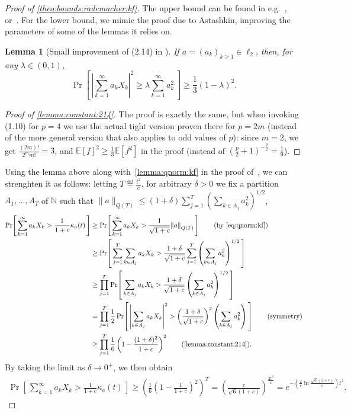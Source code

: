 \documentclass[11pt]{article}
\newtheorem{lemma}[lem]{Lemma}
\theoremstyle{remark}   	\newtheorem{remark}[theorem]{Remark}
\theoremstyle{definition}   	\newaliascnt{defn}{theorem}
\newenvironment{proofof}[1]{\begin{proof}[Proof of {#1}]}{\end{proof}}
\newcommand{\proba}{\Pr}
\newcommand{\probaOf}[1]{\proba\!\left[\, #1\, \right]}
\newcommand{\expect}[1]{\mathbb{E}\!\left[#1\right]}
\newcommand{\norm}[1]{\lVert#1{\rVert}}
\newcommand{\abs}[1]{\left\lvert #1 \right\rvert}
\newcommand{\N}{\ensuremath{\mathbb{N}}\xspace}
\newcommand{\lp}[1][1]{\ell_{#1}}
\newcommand{\kf}[1]{\kappa_{#1}}
\begin{document}
\begin{proofof}{\autoref{theo:bounds:rademacher:kf}}
The upper bound can be found in e.g.~\cite{MS:90}, or~\cite[Theorem 2.2]{Astashkin:2010}. For the lower bound, we mimic the proof due to Astashkin, improving the parameters of some of the lemmas it relies on.

\begin{lemma}[{Small improvement of (2.14) in \cite[Lemma 2.3]{Astashkin:2010}}]\label{lemma:constant:214}
  If $a=(a_k)_{k\geq 1}\in\lp[2]$, then, for any $\lambda\in(0,1)$,
  \begin{equation}
    \probaOf{ \abs{ \sum_{k=1}^\infty a_k X_k }^2 \geq \lambda \sum_{k=1}^\infty a_k^2 } \geq \frac{1}{3}(1-\lambda)^2.
  \end{equation}
\end{lemma}
\begin{proofof}{\autoref{lemma:constant:214}}
The proof is exactly the same, but when invoking (1.10) for $p=4$ we use the actual tight version proven there for $p=2m$ (instead of the more general version that also applies to odd values of $p$): since $m=2$, we get $\frac{(2m)!}{2^m m!} = 3$, and $\expect{f}^2 \geq \frac{1}{3} \expect{f^2}$ in the proof (instead of $(\frac{p}{2}+1)^{-\frac{p}{2}}=\frac{1}{9}$).
\end{proofof}

Using the lemma above along with~\autoref{lemma:qnorm:kf} in the proof of~\cite[Theorem 2.2]{Astashkin:2010}, we can strenghten it as follows: letting $T\eqdef \frac{t^2}{c}$, for arbitrary $\delta>0$ we fix a partition $A_1,\dots,A_{T}$ of $\N$ such that $\norm{a}_{Q(T)} \leq (1+\delta) \sum_{j=1}^{T} \left( \sum_{k\in A_j} a_k^2\right)^{1/2}$,
\begin{align*}
  \probaOf{ \sum_{k=1}^\infty a_k X_k > \frac{1}{1+c} \kf{a}(t) } 
  &\geq \probaOf{ \sum_{k=1}^\infty a_k X_k > \frac{1}{\sqrt{1+c}} \norm{a}_{Q(T)} }  \tag{by~\eqref{eq:qnorm:kf}} \\
  &\geq \probaOf{  \sum_{j=1}^{T} \sum_{k\in A_j} a_k X_k > \frac{1+\delta}{\sqrt{1+c}} \sum_{j=1}^{T} \left( \sum_{k\in A_j} a_k^2\right)^{1/2} }\\
  &\geq \prod_{j=1}^{T} \probaOf{  \sum_{k\in A_j} a_k X_k > \frac{1+\delta}{\sqrt{1+c}} \left( \sum_{k\in A_j} a_k^2\right)^{1/2} } \\
  &= \prod_{j=1}^{T} \frac{1}{2}\probaOf{  \abs{ \sum_{k\in A_j} a_k X_k }^2 > \left(\frac{1+\delta}{\sqrt{1+c}}\right)^2 \left( \sum_{k\in A_j} a_k^2\right) } \tag{symmetry} \\
  &\geq \prod_{j=1}^{T} \frac{1}{6}\left(1-\frac{(1+\delta)^2}{1+c}\right)^2 \tag{\autoref{lemma:constant:214}}.
\end{align*}
By taking the limit as $\delta\to 0^+$, we then obtain
\begin{align}\label{eq:intermed:result:integer}
  \probaOf{ \sum_{k=1}^\infty a_k X_k > \frac{1}{1+c} \kf{a}(t) } \geq \left(\frac{1}{6}\left(1-\frac{1}{1+c}\right)^2\right)^{T}
  = \left(\frac{c}{\sqrt{6}(1+c)}\right)^{\frac{2t^2}{c}}
  = e^{-\left( \frac{2}{c}\ln\frac{\sqrt{6}(1+c)}{c}\right) t^2 }.
\end{align}


\end{proofof}
\end{document}
